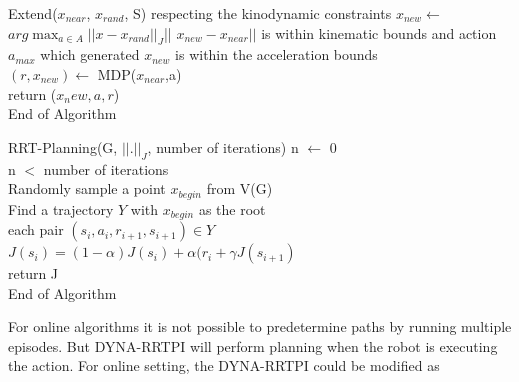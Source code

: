\documentclass[MTech]{iitmdiss}
\begin{document}
\begin{algorithm}{Extend($x_{near}$, $x_{rand}$, S)}{
\label{algo:Extend}
 respecting the kinodynamic constraints}
 $x_{new} \leftarrow$  $\displaystyle arg\max_{a \in A} ||x - x_{rand} ||_J $|| $x_{new} - x_{near} ||$ is within kinematic bounds and action $a_{max}$ which generated $x_{new}$ is within the acceleration bounds\\
 $(r,x_{new} ) \leftarrow$ MDP($x_{near}$,a)\\ 
 return ($x_new, a, r$)\\
End of Algorithm
\end{algorithm}


\begin{algorithm}{RRT-Planning(G, $|| . ||_J$, number of iterations)}{
\label{algo:Simulate RRT sampling trajectories from given rrt and update value function}
}
n $\leftarrow$ 0\\
\qwhile n $<$ number of iterations\\
Randomly sample a point $x_{begin}$ from V(G)\\
Find a trajectory $Y$ with $x_{begin}$ as the root\\
\qfor each pair $(s_i,a_i,r_{i+1}, s_{i+1}) \in Y$\\
$J(s_i) = (1 - \alpha) J(s_i) + \alpha(r_i + \gamma J(s_{i+1})$\qrof\qend\\
return J\\
End of Algorithm
\end{algorithm}


For online algorithms it is not possible to predetermine paths by running multiple episodes. But DYNA-RRTPI will perform planning when the robot is executing the action. For online setting, the DYNA-RRTPI could be modified as
\end{document}
